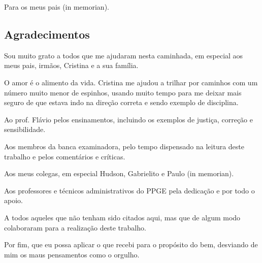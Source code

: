 \documentclass[a4paper,12pt]{report}
\begin{document}
	
	\begin{titlepage}
		
		\setlength{\topmargin}{22cm}
		\hfill{Para os meus pais (in memorian).}
	\end{titlepage}
	
	
	\begin{center}
		\section*{Agradecimentos}
	\end{center}

 		\vspace{0.3cm}
 
		Sou muito grato a todos que me ajudaram nesta caminhada, em especial aos meus pais, irmãos, Cristina e a sua família. 
		
		\vspace{0.3cm}
		
		O amor é o alimento da vida. Cristina me ajudou a trilhar por caminhos com um número muito menor de espinhos, usando muito tempo para me deixar mais seguro de que estava indo na direção correta e sendo exemplo de disciplina.
		
		\vspace{0.3cm}
		
			Ao prof. Flávio pelos ensinamentos, incluindo os exemplos de justiça, correção e sensibilidade.
			
		\vspace{0.3cm}
			
			Aos membros da banca examinadora, pelo tempo dispensado na leitura deste trabalho e pelos comentários e críticas.
			
		\vspace{0.3cm}
			
		Aos meus colegas, em especial Hudson, Gabrielito e Paulo (in memorian).
		
		\vspace{0.3cm}
		
		Aos professores e técnicos administrativos do PPGE pela dedicação e por todo o apoio.
		
		\vspace{0.3cm}
		
		A todos aqueles que não tenham sido citados aqui, mas que de algum modo colaboraram para a realização deste trabalho.
		
		\vspace{0.3cm}
		
		Por fim, que eu possa aplicar o que recebi para o propósito do bem, desviando de mim os maus pensamentos como o orgulho. 
\end{document}

